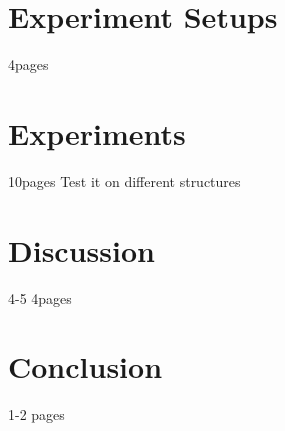 \documentclass[doctype=mastersthesis,BCOR=15mm,biblatex]{ldvbook}%
\begin{document}
\chapter{Experiment Setups}
4pages

\chapter{Experiments}
10pages
Test it on different structures

\chapter{Discussion}
4-5 4pages

\chapter{Conclusion}
1-2 pages







\printbibliography{}
\end{document}
